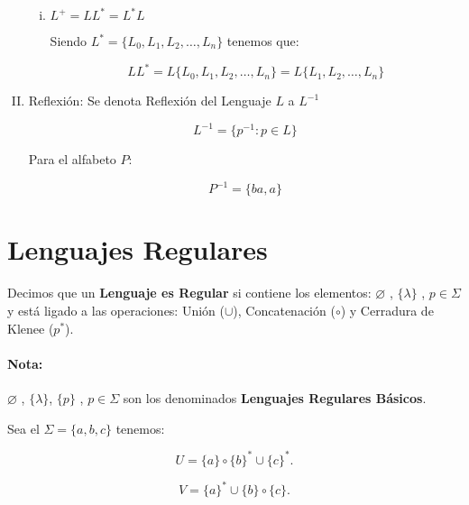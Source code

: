 \begin{enumerate}[I.]
{\begin{enumerate}[i.]
{\begin{equation}
L^+ \cup \{\lambda\} = \{L_0,L_1,L_2, \ldots, L_n\} = L^*.
\end{equation}
}
\item $L^+ = LL^* = L^*L$
{
\dhm Siendo $L^*= \{L_0,L_1,L_2,\ldots, L_n\}$ tenemos que:

\begin{equation}
LL^* = L\{L_0,L_1,L_2,\ldots, L_n\} = L\{L_1,L_2,\ldots, L_n\}
\end{equation}
}
\end{enumerate}

}\item {}Reflexión: Se denota Reflexión del Lenguaje $L$ a $L^{-1}${

\begin{equation}
L^{-1} = \{p^{-1} : p \in L\} 
\end{equation}

\ejem Para el alfabeto $P$:

\begin{equation}
P^{-1} = \{ba,a\}
\end{equation}


}
\end{enumerate}


\section{Lenguajes Regulares}

 Decimos que un \textbf{Lenguaje es Regular} si contiene los elementos: 
$\varnothing$ , $\{ \lambda \}$ , $p \in \Sigma$ y está ligado a las  
operaciones: Unión ($\cup$), Concatenación ($\circ$) y Cerradura de Klenee 
($p^{*}$).

\paragraph*{Nota:} $\varnothing$ , $\{ \lambda \}$, $\{p\}$ , $p \in \Sigma$ 
son 
los denominados \textbf{Lenguajes Regulares Básicos}.

\ejem Sea el $\Sigma = \{ a, b, c\}$ tenemos:

\begin{equation}
U = \{a\} \circ \{b\}^* \cup \{c\}^* . 
\end{equation}

\begin{equation}
V = \{a\}^* \cup \{b\} \circ \{c\}. 
\end{equation}


